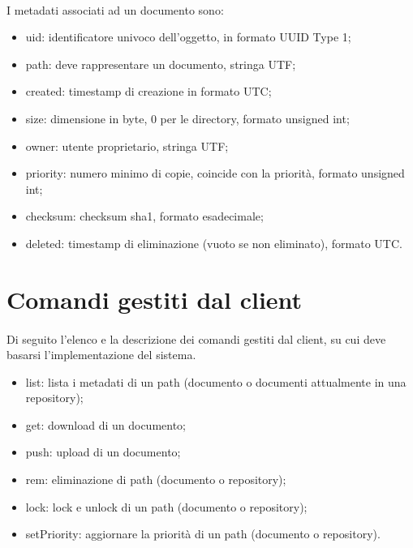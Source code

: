 \documentclass[11pt,a4paper,english]{article}
\begin{document}
\paragraph{} I metadati associati ad un documento sono: 

\begin{itemize}
	\item uid: identificatore univoco dell'oggetto, in formato UUID Type 1\cite{uuid};
	\item path: deve rappresentare un documento, stringa UTF\cite{utf};
	\item created: timestamp di creazione in formato UTC\cite{utc};
	\item size: dimensione in byte, 0 per le directory, formato unsigned int;
	\item owner: utente proprietario, stringa UTF;
	\item priority: numero minimo di copie, coincide con la priorità, formato unsigned int;
	\item checksum: checksum sha1, formato esadecimale;
	\item deleted: timestamp di eliminazione (vuoto se non eliminato), formato UTC.
\end{itemize}


\section{Comandi gestiti dal client}

\paragraph{} Di seguito l'elenco e la descrizione dei comandi gestiti dal client, su cui deve basarsi l'implementazione del sistema.

\begin{itemize}
	\item list: lista i metadati di un path (documento o documenti attualmente in una repository);
	
	\item get: download di un documento;
	
	\item push: upload di un documento;
	
	\item rem: eliminazione di path (documento o repository);
	
	\item lock: lock e unlock di un path (documento o repository);
	
	\item setPriority: aggiornare la priorità di un path (documento o repository).
\end{itemize}
\end{document}
